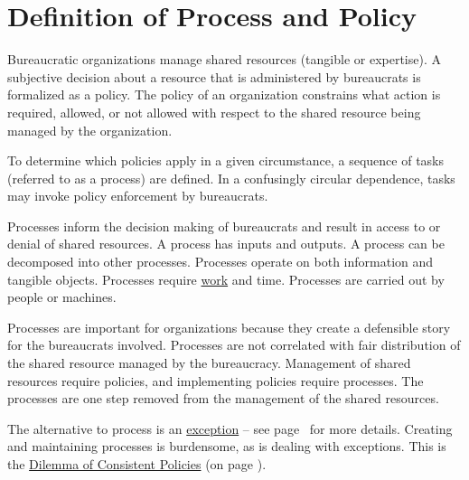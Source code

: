 \section{Definition of Process and Policy\label{sec:definition-of-process}}


Bureaucratic organizations manage shared resources (tangible or expertise). 
A subjective decision about a resource that is administered by bureaucrats is formalized as a \gls{policy}.
The policy of an organization constrains what action is required, allowed, or not allowed with respect to the shared resource being managed by the organization.

To determine which policies apply in a given circumstance, a sequence of tasks (referred to as a \gls{process}) are defined. 
In a confusingly circular dependence, tasks may invoke policy enforcement by bureaucrats. 

Processes inform the decision making of bureaucrats and result in access to or denial of shared resources. 
A process has inputs and outputs. 
A process can be decomposed into other processes. 
Processes operate on both information and tangible objects. 
Processes require \href{https://en.wikipedia.org/wiki/Work_(physics)}{work}
and time. 
Processes are carried out by people or machines.

Processes are important for organizations because they create a defensible story for the bureaucrats involved. Processes are not correlated with fair distribution of the shared resource managed by the bureaucracy. Management of shared resources require policies, and implementing policies require processes. The processes are one step removed from the management of the shared resources. 


The alternative to process is an \hyperref[sec:exceptions-to-process]{exception} -- see 
 page~\pageref{sec:exceptions-to-process} 
 for more details. 
Creating and maintaining processes is burdensome, as is dealing with exceptions. This is the \hyperref[table:policy-consistency-across-cases]{Dilemma of Consistent Policies} (on page \pageref{table:policy-consistency-across-cases}).

\ \\

